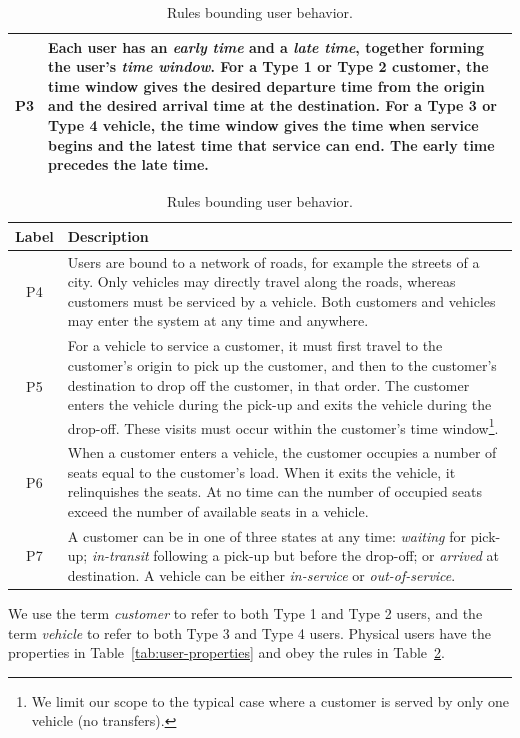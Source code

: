 \documentclass{article}
\newcommand{\hi}[1]{\noindent {\bf #1}}
\theoremstyle{definition}
\begin{document}
\begin{table}[h]
\begin{tabular}{|c|p{140mm}|}
\hline
P3 & \hi{Time Window.} Each user has an \emph{early time} and a
\emph{late time}, together forming the user's \emph{time window}. For a Type 1
or Type 2 customer, the time window gives the desired departure time from the
origin and the desired arrival time at the destination.  For a Type 3 or Type 4
vehicle, the time window gives the time when service begins and the latest time
that service can end. The early time precedes the late time.\\
\hline
\end{tabular}
\caption{Rules bounding user behavior.}
\label{tab:user-rules}
\begin{tabular}{|c|p{140mm}|}
\hline
Label & Description \\
\hline
P4 & \hi{Motion.} Users are bound to a network of roads, for
example the streets of a city. Only vehicles may directly travel along the
roads, whereas customers must be serviced by a vehicle. Both customers and
vehicles may enter the system at any time and anywhere.\\
\hline
P5 & \hi{Pick-ups and Drop-offs.} For a vehicle to service a customer, it
must first travel to the customer's origin to pick up the customer, and then to
the customer's destination to drop off the customer, in that order. The
customer enters the vehicle during the pick-up and exits the vehicle during the
drop-off. These visits must occur within the customer's time window\footnote{We
limit our scope to the typical case where a customer is served by only one
vehicle (no transfers).}.\\
\hline
P6 & \hi{Vehicle Seats.} When a customer enters a vehicle, the customer
occupies a number of seats equal to the customer's load. When it exits the
vehicle, it relinquishes the seats. At no time can the number of occupied seats
exceed the number of available seats in a vehicle.\\
\hline
P7 & \hi{User States.} A customer can be in one of three states at any
time: \emph{waiting} for pick-up; \emph{in-transit} following a pick-up but
before the drop-off; or \emph{arrived} at destination. A vehicle can be either
\emph{in-service} or \emph{out-of-service}.\\
\hline
\end{tabular}
\end{table}
We use the term \emph{customer} to refer to both Type 1 and Type 2 users, and
the term \emph{vehicle} to refer to both Type 3 and Type 4 users.
Physical users have the properties in Table~\ref{tab:user-properties} and obey
the rules in Table~\ref{tab:user-rules}.
\end{document}
